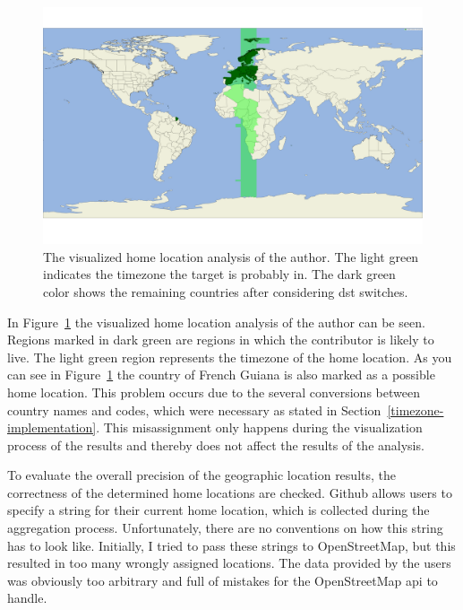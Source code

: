 \begin{figure}[H]
    \includegraphics[scale=0.10]{./graphs/analysis/author-home-location}
    \centering
    \caption{The visualized home location analysis of the author.
    The light green indicates the timezone the target is probably in.
    The dark green color shows the remaining countries after considering \ac{dst} switches.}\label{fig:author-home-location}
\end{figure}

In Figure~\ref{fig:author-home-location} the visualized home location analysis of the author can be seen.
Regions marked in dark green are regions in which the contributor is likely to live.
The light green region represents the timezone of the home location.
As you can see in Figure~\ref{fig:author-home-location} the country of French Guiana is also marked as a possible home location.
This problem occurs due to the several conversions between country names and codes, which were necessary as stated in Section~\ref{timezone-implementation}.
This misassignment only happens during the visualization process of the results and thereby does not affect the results of the analysis.

To evaluate the overall precision of the geographic location results, the correctness of the determined home locations are checked.
Github allows users to specify a string for their current home location, which is collected during the aggregation process.
Unfortunately, there are no conventions on how this string has to look like.
Initially, I tried to pass these strings to OpenStreetMap, but this resulted in too many wrongly assigned locations.
The data provided by the users was obviously too arbitrary and full of mistakes for the OpenStreetMap \ac{api} to handle.

